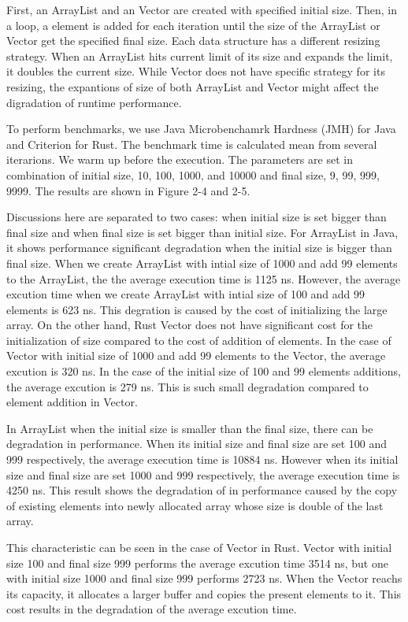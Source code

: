 First, an ArrayList and an Vector are created with specified initial size. Then, in a loop, a element is added for each iteration until the size of the ArrayList or Vector get the specified final size. 
Each data structure has a different resizing strategy. When an ArrayList hits current limit of its size and expands the limit, it doubles the current size.  
While Vector does not have specific strategy for its resizing, the expantions of size of both ArrayList and Vector might affect the digradation of runtime performance.

To perform benchmarks, we use Java Microbenchamrk Hardness (JMH) for Java and Criterion for Rust. The benchmark time is calculated mean from several iterarions. 
We warm up before the execution. The parameters are set in combination of initial size, 10, 100, 1000, and 10000 and final size, 9, 99, 999, 9999. 
The results are shown in Figure 2-4 and 2-5. 

Discussions here are separated to two cases: when initial size is set bigger than final size and when final size is set bigger than initial size. 
For ArrayList in Java, it shows performance significant degradation when the initial size is bigger than final size. When we create ArrayList with intial size of 1000 and add 99 elements 
to the ArrayList, the the average execution time is 1125 ns. However, the average excution time when we create ArrayList with intial size of 100 and add 99 elements is 623 ns. 
This degration is caused by the cost of initializing the large array. On the other hand, Rust Vector does not have significant cost for the initialization of size compared to the cost of addition of elements. 
In the case of Vector with initial size of 1000 and add 99 elements to the Vector, the average excution is 320 ns. In the case of the initial size of 100 and 99 elements additions, 
the average excution is 279 ns. This is such small degradation compared to element addition in Vector. 

In ArrayList when the initial size is smaller than the final size, there can be degradation in performance. When its initial size and final size are set 100 and 999 respectively, 
the average execution time is 10884 ns. However when its initial size and final size are set 1000 and 999 respectively, the average execution time is 4250 ns. 
This result shows the degradation of in performance caused by the copy of existing elements into newly allocated array whose size is double of the last array.

This characteristic can be seen in the case of Vector in Rust. Vector with initial size 100 and final size 999 performs the average excution time 3514 ns, 
but one with initial size 1000 and final size 999 performs 2723 ns. When the Vector reachs its capacity, it allocates a larger buffer and copies the present elements to it.
This cost results in the degradation of the average excution time.

